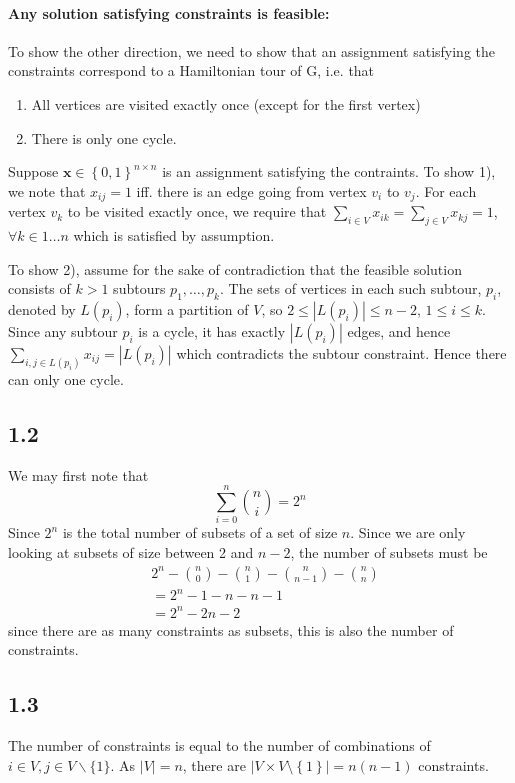 \documentclass[12pt]{article}
\begin{document}
\paragraph{Any solution satisfying constraints is feasible:}
To show the other direction, we need to show that an assignment satisfying the constraints correspond to a Hamiltonian tour of G, i.e. that
\begin{enumerate}
\item All vertices are visited exactly once (except for the first vertex)
\item There is only one cycle.
\end{enumerate}
Suppose $\mathbf{x} \in \left\{0,1\right\}^{n \times n}$ is an assignment satisfying the contraints. To show 1), we note that $x_{ij}=1$ iff. there is an edge going from vertex $v_{i}$ to $v_{j}$. For each vertex $v_{k}$ to be visited exactly once, we require that $\sum_{i \in V} x_{ik} = \sum_{j \in V} x_{kj} = 1$, $\forall k \in 1 \hdots n$ which is satisfied by assumption.

To show 2), assume for the sake of contradiction that the feasible solution consists of $k>1$ subtours $p_{1}, \hdots , p_{k}$. The sets of vertices in each such subtour, $p_{i}$, denoted by $L(p_{i})$, form a partition of $V$, so $2 \leq \left| L(p_{i}) \right| \leq n-2$, $1 \leq i \leq k$. Since any subtour $p_{i}$ is a cycle, it has exactly $|L(p_i)|$ edges, and hence $\sum_{i,j \in L(p_{i})} x_{ij} = |L(p_{i})|$ which contradicts the subtour constraint. Hence there can only one cycle.


\subsection*{1.2}

We may first note that 
$$
\sum_{i=0}^n\binom{n}{i} = 2^n
$$
Since $2^n$ is the total number of subsets of a set of size $n$. Since we are only looking at subsets of size between 2 and $n-2$, the number of subsets must be 
\begin{align*}
&2^n - \binom{n}{0} - \binom{n}{1} - \binom{n}{n-1} - \binom{n}{n} \\
&=2^n - 1 - n - n - 1 \\
&= 2^n - 2n - 2 
\end{align*}
since there are as many constraints as subsets, this is also the number of constraints.
\subsection*{1.3}
The number of constraints is equal to the number of combinations of $i \in V, j \in V \backslash\{1\}$. As $|V| = n$, there are $\left|V \times V \setminus \left\{1\right\} \right| = n(n-1)$ constraints.
\end{document}
